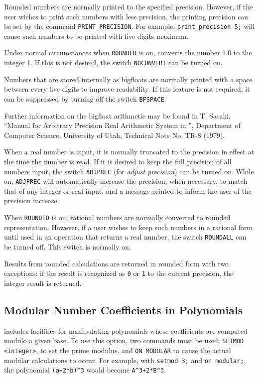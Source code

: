 \hypertarget{command:PRINT_PRECISION}{}
Rounded numbers are normally printed to the specified precision.  However,
if the user wishes to print such numbers with less precision, the printing
precision can be set by the command {\tt PRINT\_PRECISION}.
 For example, {\tt print\_precision 5;} will
cause such numbers to be printed with five digits maximum.

\hypertarget{switch:NOCONVERT}{}
Under normal circumstances when {\tt ROUNDED} is on, {\REDUCE} converts the
number 1.0 to the integer 1.  If this is not desired, the switch
{\tt NOCONVERT} can be turned on.

\hypertarget{switch:BFSPACE}{}
Numbers that are stored internally as bigfloats are normally printed with
a space between every five digits to improve readability.  If this
feature is not required, it can be suppressed by turning off the switch
{\tt BFSPACE}.

Further information on the bigfloat arithmetic may be found in T. Sasaki,
``Manual for Arbitrary Precision Real Arithmetic System in {\REDUCE}'',
Department of Computer Science, University of Utah, Technical Note No.
TR-8 (1979).

\hypertarget{switch:ADJPREC}{}
When a real number is input, it is normally truncated to the precision in
effect at the time the number is read.  If it is desired to keep the full
precision of all numbers input, the switch {\tt ADJPREC}
(for {\em adjust precision\/}) can be turned on.  While on, {\tt ADJPREC}
will automatically increase the precision, when necessary, to match that
of any integer or real input, and a message printed to inform the user of
the precision increase.

\hypertarget{switch:ROUNDALL}{}
When {\tt ROUNDED} is on, rational numbers are normally converted to
rounded representation.  However, if a user wishes to keep such numbers in
a rational form until used in an operation that returns a real number,
the switch {\tt ROUNDALL} can be turned off.  This
switch is normally on.

Results from rounded calculations are returned in rounded form with two
exceptions: if the result is recognized as {\tt 0} or {\tt 1} to the
current precision, the integer result is returned.

\subsection{Modular Number Coefficients in Polynomials}
\hypertarget{switch:MODULAR}{}
\hypertarget{command:SETMOD}{}
{\REDUCE} includes facilities for manipulating polynomials whose
coefficients are computed modulo a given base.  To use this option, two
commands must be used; {\tt SETMOD} {\tt <integer>}, to set
the prime modulus, and {\tt ON MODULAR} to cause the
actual modular calculations to occur.
For example, with {\tt setmod 3;} and {\tt on modular;}, the polynomial
{\tt (a+2*b)\verb|^|3} would become {\tt A\verb|^|3+2*B\verb|^|3}.

